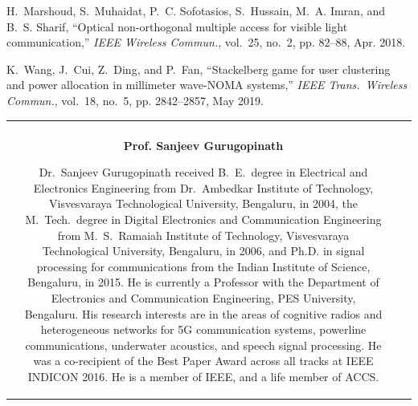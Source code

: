 \begin{multicols}{2}
\begin{thebibliography}{99}
H.~{Marshoud}, S.~{Muhaidat}, P.~C. {Sofotasios}, S.~{Hussain}, M.~A. {Imran},
  and B.~S. {Sharif}, ``Optical non-orthogonal multiple access for visible
  light communication,'' \emph{{IEEE} Wireless Commun.}, vol.~25, no.~2, pp.
  82--88, Apr. 2018.

K.~{Wang}, J.~{Cui}, Z.~{Ding}, and P.~{Fan}, ``Stackelberg game for user
  clustering and power allocation in millimeter wave-{NOMA} systems,''
  \emph{IEEE Trans.\ Wireless Commun.}, vol.~18, no.~5, pp. 2842--2857, May
  2019.
\end{thebibliography}
\end{multicols}

\vskip 1cm


\noindent
\begin{tabular}{V{2.5}cp{14.6cm}V{2.5}}
 &\\

 & 

\centerline{\large\bf Prof. Sanjeev Gurugopinath}

\bigskip
Dr.~Sanjeev Gurugopinath received B.~E.~degree in Electrical and Electronics Engineering from Dr.~Ambedkar Institute of Technology, Visvesvaraya Technological University, Bengaluru, in 2004, the M.~Tech.~degree in Digital Electronics and Communication Engineering from  M.~S.~Ramaiah Institute of Technology, Visvesvaraya Technological University, Bengaluru, in 2006, and  Ph.D. in signal processing for communications from the Indian Institute of Science, Bengaluru, in 2015. He is currently a Professor with the Department of Electronics and Communication Engineering, PES University, Bengaluru. His research interests are in the areas of cognitive radios and heterogeneous networks for 5G communication systems, powerline communications, underwater acoustics, and speech signal processing. He was a co-recipient of the Best Paper Award across all tracks at IEEE INDICON 2016. He is a member of IEEE, and a life member of ACCS.\\


\end{tabular}
